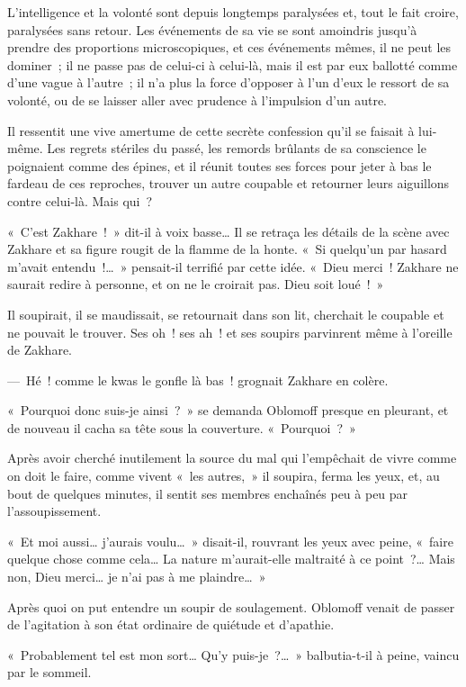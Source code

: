 \documentclass[french,twoside]{book} %
\begin{document}
L’intelligence et la volonté sont depuis longtemps paralysées et, tout le fait croire, paralysées sans retour. Les événements de sa vie se sont amoindris jusqu’à prendre des proportions microscopiques, et ces événements mêmes, il ne peut les dominer ; il ne passe pas de celui-ci à celui-là, mais il est par eux ballotté comme d’une vague à l’autre ; il n’a plus la force d’opposer à l’un d’eux le ressort de sa volonté, ou de se laisser aller avec prudence à l’impulsion d’un autre.\par
Il ressentit une vive amertume de cette secrète confession qu’il se faisait à lui-même. Les regrets stériles du passé, les remords brûlants de sa conscience le poignaient comme des épines, et il réunit toutes ses forces pour jeter à bas le fardeau de ces reproches, trouver un autre coupable et retourner leurs aiguillons contre celui-là. Mais qui ?\par
« C’est Zakhare ! » dit-il à voix basse… Il se retraça les détails de la scène avec Zakhare et sa figure rougit de la flamme de la honte. « Si quelqu’un par hasard m’avait entendu !… » pensait-il terrifié par cette idée. « Dieu merci ! Zakhare ne saurait redire à personne, et on ne le croirait pas. Dieu soit loué ! »\par
Il soupirait, il se maudissait, se retournait dans son lit, cherchait le coupable et ne pouvait le trouver. Ses oh ! ses ah ! et ses soupirs parvinrent même à l’oreille de Zakhare.\par
— Hé ! comme le kwas le gonfle là bas ! grognait Zakhare en colère.\par
« Pourquoi donc suis-je ainsi ? » se demanda Oblomoff presque en pleurant, et de nouveau il cacha sa tête sous la couverture. « Pourquoi ? »\par
Après avoir cherché inutilement la source du mal qui l’empêchait de vivre comme on doit le faire, comme vivent « les autres, » il soupira, ferma les yeux, et, au bout de quelques minutes, il sentit ses membres enchaînés peu à peu par l’assoupissement.\par
« Et moi aussi… j’aurais voulu… » disait-il, rouvrant les yeux avec peine, « faire quelque chose comme cela… La nature m’aurait-elle maltraité à ce point ?… Mais non, Dieu merci… je n’ai pas à me plaindre… »\par
Après quoi on put entendre un soupir de soulagement. Oblomoff venait de passer de l’agitation à son état ordinaire de quiétude et d’apathie.\par
« Probablement tel est mon sort… Qu’y puis-je ?… » balbutia-t-il à peine, vaincu par le sommeil.\par
\end{document}
